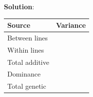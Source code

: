 \documentclass[
]{article}
\begin{document}
\textbf{Solution}:

\begin{table}[H]
\centering
\begin{tabular}{l>{\raggedright\arraybackslash}p{8cm}}
\toprule
Source & Variance\\
\midrule
\begingroup\fontsize{12}{14}\selectfont Between lines\endgroup & \begingroup\fontsize{12}{14}\selectfont \endgroup\\
\begingroup\fontsize{12}{14}\selectfont Within lines\endgroup & \begingroup\fontsize{12}{14}\selectfont \endgroup\\
\begingroup\fontsize{12}{14}\selectfont Total additive\endgroup & \begingroup\fontsize{12}{14}\selectfont \endgroup\\
\begingroup\fontsize{12}{14}\selectfont Dominance\endgroup & \begingroup\fontsize{12}{14}\selectfont \endgroup\\
\begingroup\fontsize{12}{14}\selectfont Total genetic\endgroup & \begingroup\fontsize{12}{14}\selectfont \endgroup\\
\bottomrule
\end{tabular}
\end{table}
\end{document}
